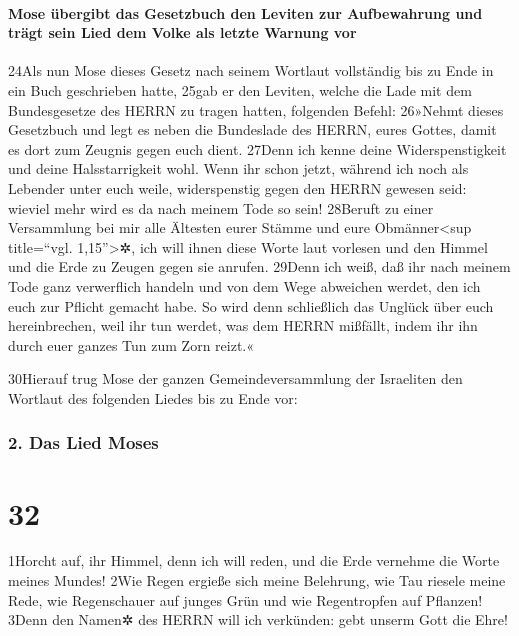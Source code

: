 \hypertarget{mose-uxfcbergibt-das-gesetzbuch-den-leviten-zur-aufbewahrung-und-truxe4gt-sein-lied-dem-volke-als-letzte-warnung-vor}{%
\paragraph{Mose übergibt das Gesetzbuch den Leviten zur Aufbewahrung und
trägt sein Lied dem Volke als letzte Warnung
vor}\label{mose-uxfcbergibt-das-gesetzbuch-den-leviten-zur-aufbewahrung-und-truxe4gt-sein-lied-dem-volke-als-letzte-warnung-vor}}

24Als nun Mose dieses Gesetz nach seinem Wortlaut vollständig bis zu
Ende in ein Buch geschrieben hatte, 25gab er den Leviten, welche die
Lade mit dem Bundesgesetze des HERRN zu tragen hatten, folgenden Befehl:
26»Nehmt dieses Gesetzbuch und legt es neben die Bundeslade des HERRN,
eures Gottes, damit es dort zum Zeugnis gegen euch dient. 27Denn ich
kenne deine Widerspenstigkeit und deine Halsstarrigkeit wohl. Wenn ihr
schon jetzt, während ich noch als Lebender unter euch weile,
widerspenstig gegen den HERRN gewesen seid: wieviel mehr wird es da nach
meinem Tode so sein! 28Beruft zu einer Versammlung bei mir alle Ältesten
eurer Stämme und eure Obmänner\textless sup title=``vgl.
1,15''\textgreater✲, ich will ihnen diese Worte laut vorlesen und den
Himmel und die Erde zu Zeugen gegen sie anrufen. 29Denn ich weiß, daß
ihr nach meinem Tode ganz verwerflich handeln und von dem Wege abweichen
werdet, den ich euch zur Pflicht gemacht habe. So wird denn schließlich
das Unglück über euch hereinbrechen, weil ihr tun werdet, was dem HERRN
mißfällt, indem ihr ihn durch euer ganzes Tun zum Zorn reizt.«

30Hierauf trug Mose der ganzen Gemeindeversammlung der Israeliten den
Wortlaut des folgenden Liedes bis zu Ende vor:

\hypertarget{das-lied-moses}{%
\subsubsection{2. Das Lied Moses}\label{das-lied-moses}}

\hypertarget{section-31}{%
\section{32}\label{section-31}}

1Horcht auf, ihr Himmel, denn ich will reden, und die Erde vernehme die
Worte meines Mundes! 2Wie Regen ergieße sich meine Belehrung, wie Tau
riesele meine Rede, wie Regenschauer auf junges Grün und wie
Regentropfen auf Pflanzen! 3Denn den Namen✲ des HERRN will ich
verkünden: gebt unserm Gott die Ehre!

